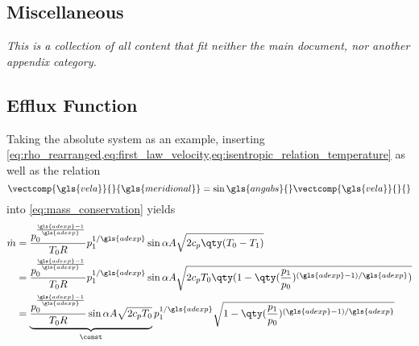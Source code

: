 \begin{appendices}
\clearpage

\section{Miscellaneous}\label{ch:misc}

\textit{This  is a collection of all content that fit neither the main document, nor another appendix category.}

\subsection{Efflux Function}\label{ch:efflux_function}

Taking the absolute system as an example, inserting \cref{eq:rho_rearranged,eq:first_law_velocity,eq:isentropic_relation_temperature} as well as the relation
\begin{equation}
	\vectcomp{\gls{vela}}{}{\gls{meridional}} = \sin\gls{angabs}{}\vectcomp{\gls{vela}}{}{}
\end{equation}
into \cref{eq:mass_conservation} yields
\begin{equation}
\begin{aligned}
\dot{m} &= \frac{p_0^{\frac{\gls{adexp}-1}{\gls{adexp}}}}{T_0 R}p_1^{1/\gls{adexp}}  \sin\alpha A \sqrt{2c_p\qty(T_0 - T_1)} \\
&= \frac{p_0^{\frac{\gls{adexp}-1}{\gls{adexp}}}}{T_0 R} p_1^{1/\gls{adexp}} \sin\alpha A\sqrt{2c_pT_0\qty(1 - \qty(\frac{p_1}{p_0})^{(\gls{adexp}-1)/\gls{adexp}})} \\
&= \underbrace{\frac{p_0^{\frac{\gls{adexp}-1}{\gls{adexp}}}}{T_0 R} \sin\alpha A \sqrt{2c_pT_0}}_{\mathrm{\const}} p_1^{1/\gls{adexp}} \sqrt{1 - \qty(\frac{p_1}{p_0})^{(\gls{adexp}-1)/\gls{adexp}}}
\end{aligned}
\end{equation}


\end{appendices}
